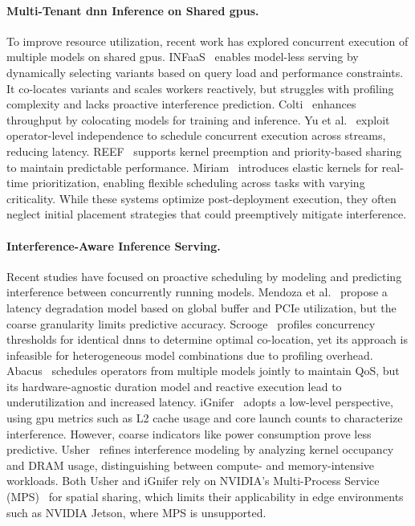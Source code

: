 \paragraph{Multi-Tenant \acrshort{dnn} Inference on Shared \acrshort{gpu}s.}
To improve resource utilization, recent work has explored concurrent execution of multiple models on shared \acrshort{gpu}s. INFaaS~\cite{francisco2021infaas} enables model-less serving by dynamically selecting variants based on query load and performance constraints. It co-locates variants and scales workers reactively, but struggles with profiling complexity and lacks proactive interference prediction. Colti~\cite{mobin2023colti} enhances throughput by colocating models for training and inference. Yu et al.~\cite{yu2021automated} exploit operator-level independence to schedule concurrent execution across streams, reducing latency. REEF~\cite{han2022microsecond} supports kernel preemption and priority-based sharing to maintain predictable performance. Miriam~\cite{zhao2023miriam} introduces elastic kernels for real-time prioritization, enabling flexible scheduling across tasks with varying criticality. While these systems optimize post-deployment execution, they often neglect initial placement strategies that could preemptively mitigate interference.

\paragraph{Interference-Aware Inference Serving.}
Recent studies have focused on proactive scheduling by modeling and predicting interference between concurrently running models. Mendoza et al.~\cite{mendoza2021interference} propose a latency degradation model based on global buffer and PCIe utilization, but the coarse granularity limits predictive accuracy. Scrooge~\cite{hu2021scrooge} profiles concurrency thresholds for identical \acrshort{dnn}s to determine optimal co-location, yet its approach is infeasible for heterogeneous model combinations due to profiling overhead. Abacus~\cite{cui2021Abacus} schedules operators from multiple models jointly to maintain QoS, but its hardware-agnostic duration model and reactive execution lead to underutilization and increased latency. iGnifer~\cite{xu2023iGniter} adopts a low-level perspective, using \acrshort{gpu} metrics such as L2 cache usage and core launch counts to characterize interference. However, coarse indicators like power consumption prove less predictive. Usher~\cite{shubha2024usher} refines interference modeling by analyzing kernel occupancy and DRAM usage, distinguishing between compute- and memory-intensive workloads. Both Usher and iGnifer rely on NVIDIA's Multi-Process Service (MPS)~\cite{nvidiaMPS575} for spatial sharing, which limits their applicability in edge environments such as NVIDIA Jetson, where MPS is unsupported.